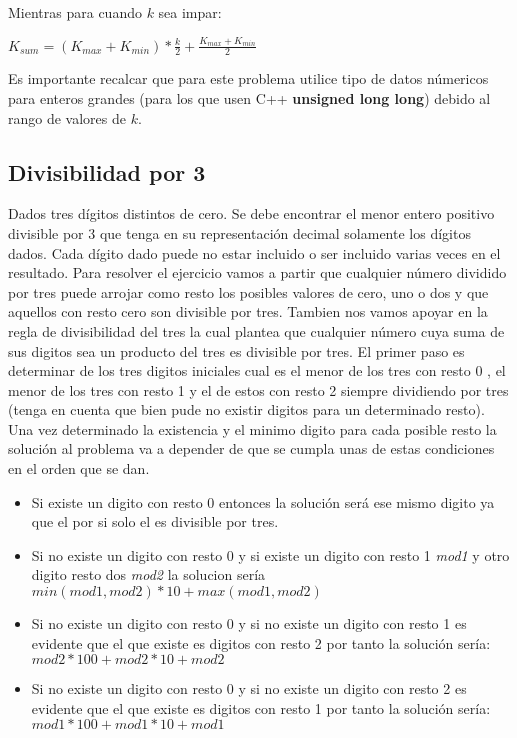 Mientras para cuando $k$ sea impar:

$K_{sum}= (K_{max}+K_{min}) * \frac{k}{2} + \frac{K_{max}+K_{min}}{2}$

Es importante recalcar que para este problema utilice tipo de datos númericos para enteros grandes (para los que usen C++ \textbf{unsigned long long}) debido al rango de valores de $k$.


\subsection{Divisibilidad por 3} Dados tres dígitos distintos de cero. Se debe encontrar el menor entero positivo divisible por 3 que tenga en su representación decimal solamente los dígitos dados. Cada dígito
dado puede no estar incluido o ser incluido varias veces en el resultado. Para resolver el ejercicio vamos a partir que cualquier número dividido por tres puede arrojar como resto los posibles valores de cero, uno o dos y que aquellos con resto cero son divisible por tres. Tambien nos vamos apoyar en la regla de divisibilidad del tres la cual plantea que cualquier número cuya suma de sus digitos sea un producto del tres es divisible por tres. El primer paso es determinar de los tres digitos iniciales cual es el menor de los tres con resto 0 , el menor de los tres con resto 1 y el de estos con resto 2 siempre dividiendo por tres (tenga en cuenta que bien pude no existir digitos para un determinado resto). Una vez determinado la existencia y el minimo digito para cada posible resto la solución al problema va a depender de que se cumpla unas de estas condiciones en el orden que se dan. 

\begin{itemize}
	\item Si existe un digito con resto 0 entonces la solución será ese mismo digito ya que el por si solo el es divisible por tres.
	\item Si no existe un digito con resto 0 y si existe un digito con resto 1 \emph{mod1} y otro digito resto dos \emph{mod2} la solucion sería $min(mod1,mod2)*10+max(mod1,mod2)$ 
	\item Si no existe un digito con resto 0 y si no existe un digito con resto 1 es evidente que el que existe es digitos con resto 2 por tanto la solución sería: $mod2*100+mod2*10+mod2$  
	\item Si no existe un digito con resto 0 y si no existe un digito con resto 2 es evidente que el que existe es digitos con resto 1 por tanto la solución sería: $mod1*100+mod1*10+mod1$
\end{itemize}  


